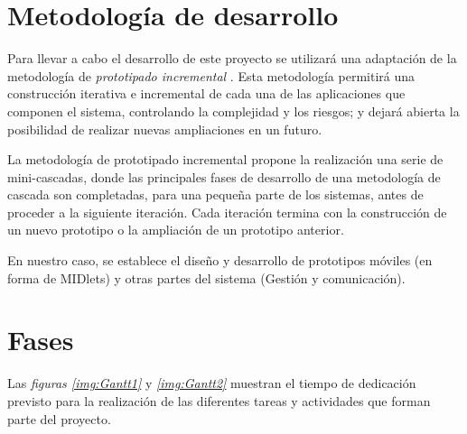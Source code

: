 \section{Metodología de desarrollo}
Para llevar a cabo el desarrollo de este proyecto se utilizará una adaptación
de la metodología de \emph{prototipado incremental} \cite{bib:PI}. Esta
metodología permitirá una construcción iterativa e incremental de cada una de
las aplicaciones que componen el sistema, controlando la complejidad y los
riesgos; y dejará abierta la posibilidad de realizar nuevas ampliaciones en un
futuro. 

La metodología de prototipado incremental propone la realización una serie de
mini-cascadas, donde las principales fases de desarrollo de una metodología
de cascada son completadas, para una pequeña parte de los sistemas, antes de
proceder a la siguiente iteración. Cada iteración termina con la construcción
de un nuevo prototipo o la ampliación de un prototipo anterior.

En nuestro caso, se establece el diseño y desarrollo de prototipos móviles (en forma de MIDlets) y otras partes del sistema (Gestión y comunicación).

\section{Fases}
Las \emph{figuras \ref{img:Gantt1}} y \emph{\ref{img:Gantt2}} muestran el
tiempo de dedicación previsto para la realización de las diferentes tareas y
actividades que forman parte del proyecto.

\begin{sidewaysfigure}
\end{sidewaysfigure}

\begin{sidewaysfigure}
\end{sidewaysfigure}



